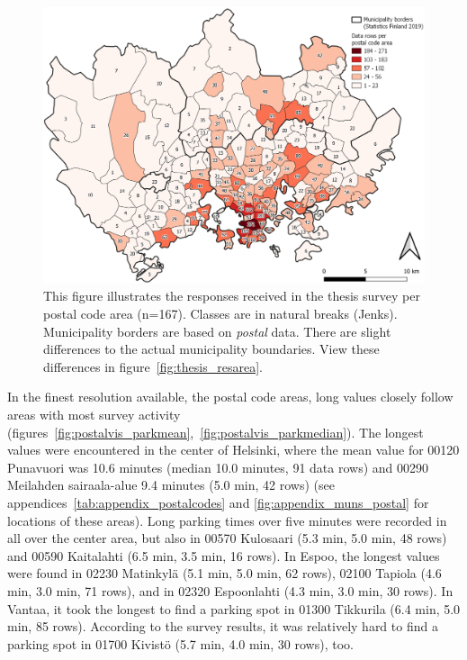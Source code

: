 \begin{figure}[H]%
    \centering
    \includegraphics[width=\textwidth]{images/thesis_postalvis_answers.png}
    \caption[Data rows received per postal code area]{This figure illustrates the responses received in the thesis survey per postal code area (n=167). Classes are in natural breaks (Jenks). Municipality borders are based on \textit{postal} data. There are slight differences to the actual municipality boundaries. View these differences in figure~\ref{fig:thesis_resarea}.}%
    \label{fig:postalvis_answers}%
\end{figure}

In the finest resolution available, the postal code areas, long  values closely follow areas with most survey activity (figures~\ref{fig:postalvis_parkmean},~\ref{fig:postalvis_parkmedian}). The longest  values were encountered in the center of Helsinki, where the mean value for 00120 Punavuori was 10.6 minutes (median 10.0 minutes, 91 data rows) and 00290 Meilahden sairaala-alue 9.4 minutes (5.0 min, 42 rows) (see appendices~\ref{tab:appendix_postalcodes} and \ref{fig:appendix_muns_postal} for locations of these areas). Long parking times over five minutes were recorded in all over the center area, but also in 00570 Kulosaari (5.3 min, 5.0 min, 48 rows) and 00590 Kaitalahti (6.5 min, 3.5 min, 16 rows). In Espoo, the longest  values were found in 02230 Matinkylä (5.1 min, 5.0 min, 62 rows), 02100 Tapiola (4.6 min, 3.0 min, 71 rows), and in 02320 Espoonlahti (4.3 min, 3.0 min, 30 rows). In Vantaa, it took the longest to find a parking spot in 01300 Tikkurila (6.4 min, 5.0 min, 85 rows). According to the survey results, it was relatively hard to find a parking spot in 01700 Kivistö (5.7 min, 4.0 min, 30 rows), too.

